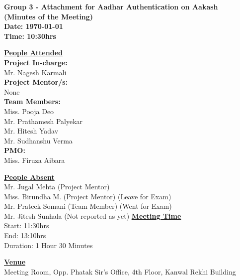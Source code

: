 \documentclass[a4paper,12pt]{article}
\begin{document}
\LARGE
\begin{center}
\textbf
{
Group 3 - Attachment for Aadhar Authentication on Aakash\\
(Minutes of the Meeting) \\ 
Date: \today \\
Time: 10:30hrs
}
\end{center}

\vfill

\large

\underline{\textbf{People Attended}} \\ 

\indent \textbf{Project In-charge:} \\
\indent Mr. Nagesh Karmali \\

\indent \textbf{Project Mentor/s:} \\
\indent None \\

\indent \textbf{Team Members:} \\
\indent Miss. Pooja Deo \\
\indent Mr. Prathamesh Palyekar \\
\indent Mr. Hitesh Yadav \\
\indent Mr. Sudhanshu Verma \\

\indent \textbf{PMO:} \\
\indent Miss. Firuza Aibara\\

\vfill

\underline{\textbf{People Absent}} \\ 
\indent Mr. Jugal Mehta (Project Mentor)\\
\indent Miss. Birundha M. (Project Mentor) (Leave for Exam)\\
\indent Mr. Prateek Somani (Team Member) (Went for Exam) \\
\indent Mr. Jitesh Sunhala (Not reported as yet)
\vfill
\vskip20pt
\underline{\textbf{Meeting Time}} \\
\indent Start: 11:30hrs \\
\indent End: 13:10hrs \\
\indent Duration: 1 Hour 30 Minutes \\

\vskip20pt

\underline{\textbf{Venue}} \\
\indent Meeting Room, Opp. Phatak Sir's Office, 4th Floor, Kanwal Rekhi Building
\end{document}
